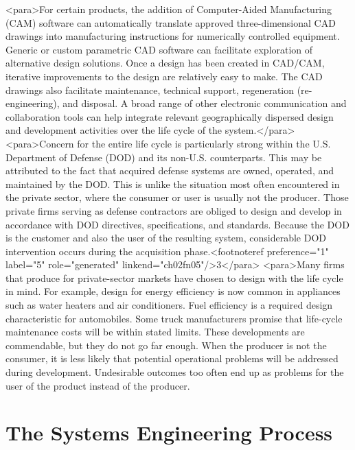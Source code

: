 <para>For certain products, the addition of Computer-Aided Manufacturing (CAM) software can automatically translate approved three-dimensional CAD drawings into manufacturing instructions for numerically controlled equipment. Generic or custom parametric CAD software can facilitate exploration of alternative design solutions. Once a design has been created in CAD/CAM, iterative improvements to the design are relatively easy to make. The CAD drawings also facilitate maintenance, technical support, regeneration (re-engineering), and disposal. A broad range of other electronic communication and collaboration tools can help integrate relevant geographically dispersed design and development activities over the life cycle of the system.</para>
<para>Concern for the entire life cycle is particularly strong within the U.S. Department of Defense (DOD) and its non-U.S. counterparts. This may be attributed to the fact that acquired defense systems are owned, operated, and maintained by the DOD. This is unlike the situation most often encountered in the private sector, where the consumer or user is usually not the producer. Those private firms serving as defense contractors are obliged to design and develop in accordance with DOD directives, specifications, and standards. Because the DOD is the customer and also the user of the resulting system, considerable DOD intervention occurs during the acquisition phase.<footnoteref preference="1" label="5" role="generated" linkend="ch02fn05"/>3</para>
<para>Many firms that produce for private-sector markets have chosen to design with the life cycle in mind. For example, design for energy efficiency is now common in appliances such as water heaters and air conditioners. Fuel efficiency is a required design characteristic for automobiles. Some truck manufacturers promise that life-cycle maintenance costs will be within stated limits. These developments are commendable, but they do not go far enough. When the producer is not the consumer, it is less likely that potential operational problems will be addressed during development. Undesirable outcomes too often end up as problems for the user of the product instead of the producer.


\section{The Systems Engineering Process}

